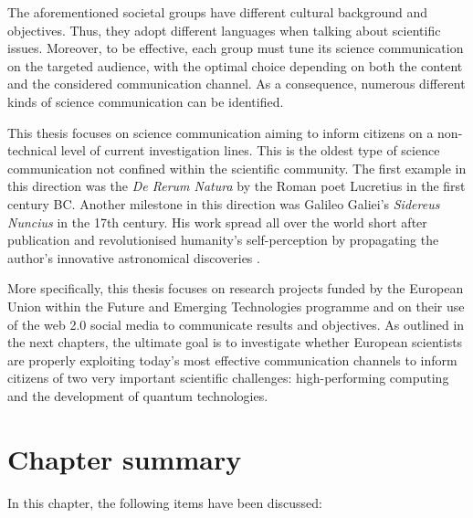 The aforementioned societal groups have different cultural background and objectives. Thus, they adopt different languages when talking about scientific issues. Moreover, to be effective, each group must tune its science communication on the targeted audience, with the optimal choice depending on both the content and the considered communication channel. As a consequence, numerous different kinds of science communication can be identified.   

This thesis focuses on science communication aiming to inform citizens on a non-technical level of current investigation lines. This is the oldest type of science communication not confined within the scientific community. The first example in this direction was the \textit{De Rerum Natura} by the Roman poet Lucretius in the first century BC. Another milestone in this direction was Galileo Galiei's \textit{Sidereus Nuncius} in the 17th century. His work spread all over the world short after publication and revolutionised humanity's self-perception by propagating the author's innovative astronomical discoveries \cite{Burke}.

More specifically, this thesis focuses on research projects funded by the European Union within the Future and Emerging Technologies programme and on their use of the web 2.0 social media to communicate results and objectives. As outlined in the next chapters, the ultimate goal is to investigate whether European scientists are properly exploiting today's most effective communication channels to inform citizens of two very important scientific challenges: high-performing computing and the development of quantum technologies.

\section{Chapter summary} 
In this chapter, the following items have been discussed:

